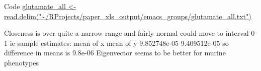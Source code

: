 Code \url{glutamate_all <- read.delim("~/RProjects/paper_xls_output/emacs_groups/glutamate_all.txt")}


Closeness is over quite a narrow range and fairly normal could move to interval 0-1
ie sample estimates:
   mean of x    mean of y 
9.852748e-05 9.409512e-05 so difference in means is 9.8e-06
Eigenvector seems to be better for murine phenotypes
